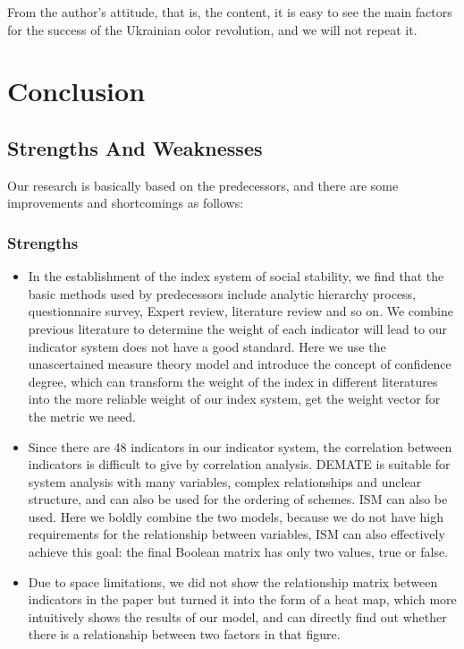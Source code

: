 \documentclass[12pt]{article}  %
\begin{document}
From the author's attitude, that is, the content, it is easy to see the main factors for the success of the Ukrainian color revolution, and we will not repeat it.
\newpage
\section{Conclusion}
\subsection{Strengths And Weaknesses}
Our research is basically based on the predecessors, and there are some improvements and shortcomings as follows:
\subsubsection{Strengths}
\begin{itemize}
    \item In the establishment of the index system of social stability, we find that the basic methods used by predecessors include analytic hierarchy process, questionnaire survey, Expert review, literature review and so on. We combine previous literature to determine the weight of each indicator will lead to our indicator system does not have a good standard. Here we use the unascertained measure theory model and introduce the concept of confidence degree, which can transform the weight of the index in different literatures into the more reliable weight of our index system, get the weight vector for the metric we need.
    \item Since there are 48 indicators in our indicator system, the correlation between indicators is difficult to give by correlation analysis. DEMATE is suitable for system analysis with many variables, complex relationships and unclear structure, and can also be used for the ordering of schemes. ISM can also be used. Here we boldly combine the two models, because we do not have high requirements for the relationship between variables, ISM can also effectively achieve this goal: the final Boolean matrix has only two values, true or false.
    \item Due to space limitations, we did not show the relationship matrix between indicators in the paper but turned it into the form of a heat map, which more intuitively shows the results of our model, and can directly find out whether there is a relationship between two factors in that figure.
\end{itemize}
\end{document}

